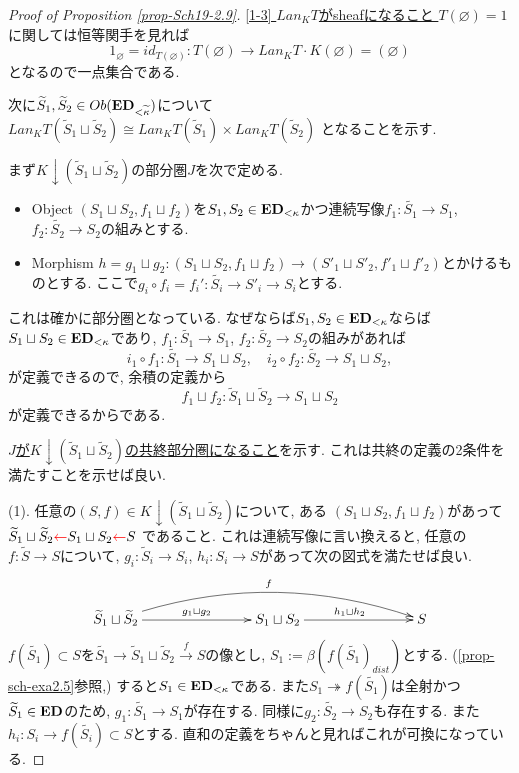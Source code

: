 \documentclass[dvipdfmx,a4paper,11pt]{article}
\theoremstyle{definition}
\newcommand{\xr}[1]{\textcolor{red}{#1}}
\begin{document}
\begin{proof}[Proof of Proposition \ref{prop-Sch19-2.9}]
\underline{[1-3] $Lan_{K}T$がsheafになること }
$T(\varnothing)=1$に関しては恒等関手を見れば
$$
1_{\varnothing}=id_{T(\varnothing)} : T(\varnothing) \to   Lan_{K}T\cdot K(\varnothing)=(\varnothing)
$$
となるので一点集合である.

次に$\widetilde{S}_1,  \widetilde{S}_2\in Ob({\bf ED}_{<\widetilde{\kappa}})$について
$Lan_{K}T (\widetilde{S}_1 \sqcup  \widetilde{S}_2) \cong
 Lan_{K}T (\widetilde{S}_1 ) \times  Lan_{K}T ( \widetilde{S}_2)$
となることを示す.

まず$K \downarrow  (\widetilde{S}_1 \sqcup  \widetilde{S}_2)$の部分圏$J$を次で定める.
\begin{itemize}
\item Object $(S_1 \sqcup  S_2, f_1 \sqcup  f_2)$を$S_1, S_2 \in {\bf ED}_{<\kappa}$かつ連続写像$f_1 : \widetilde{S_1} \to S_1$, $f_2 : \widetilde{S_2} \to S_2$の組みとする. 
\item Morphism $h=g_1\sqcup g_2 : (S_1 \sqcup S_2, f_1 \sqcup f_2) \to  (S'_{1} \sqcup S'_2, f'_1 \sqcup f'_2)$とかけるものとする. ここで$g_i \circ f_i = f_{i}' : \widetilde{S_i} \to S'_i \to S_{i}$とする. 
\end{itemize}
これは確かに部分圏となっている. 
なぜならば$S_1, S_2 \in {\bf ED}_{<\kappa}$ならば$S_1 \sqcup  S_2 \in {\bf ED}_{<\kappa}$であり, $f_1 : \widetilde{S_1} \to S_1$, $f_2 : \widetilde{S_2} \to S_2$の組みがあれば
$$
i_1 \circ f_1 : \widetilde{S_1} \to S_1 \sqcup S_2, \quad 
i_2 \circ f_2 : \widetilde{S_2} \to S_1 \sqcup S_2,
$$
が定義できるので, 余積の定義から
$$
f_1 \sqcup f_2  : \widetilde{S}_1 \sqcup \widetilde{S}_2  \to S_1 \sqcup S_2
$$
が定義できるからである. 

\underline{$J$が$K \downarrow  (\widetilde{S}_1 \sqcup  \widetilde{S}_2)$の共終部分圏になること}を示す. 
これは共終の定義の2条件を満たすことを示せば良い.

(1). 任意の$(S, f) \in K \downarrow  (\widetilde{S}_1 \sqcup  \widetilde{S}_2)$について, ある
$(S_1 \sqcup  S_2, f_1 \sqcup  f_2)$があって
$\widetilde{S}_1 \sqcup  \widetilde{S}_2 \xr{\leftarrow} S_1 \sqcup  S_2  \xr{\leftarrow} S$
であること.
これは連続写像に言い換えると, 任意の$f : \widetilde{S} \to S$について, 
$g_i: \widetilde{S}_i \to S_i$, $h_i: S_i \to S$があって次の図式を満たせば良い.
\begin{equation*}
\label{eq-conti}
\xymatrix@C=78pt@R=20pt{
\widetilde{S}_1 \sqcup  \widetilde{S}_2 \ar@/^20pt/[rr]^{f} 
 \ar@{->}[r]^{g_1 \sqcup  g_2}
&S_1 \sqcup  S_2  \ar@{->}[r]^{h_1 \sqcup  h_2}
& S
\\
}
\end{equation*}
$f(\widetilde{S_1} ) \subset S$を$\widetilde{S_1} \to \widetilde{S}_1 \sqcup  \widetilde{S}_2 \overset{f}{\to} S$の像とし, $S_1 := \beta (f(\widetilde{S_1} )_{dist}) $とする. (\ref{prop-sch-exa2.5}参照,)
すると$S_1 \in {\bf ED}_{<\kappa}$である.
また$S_1 \twoheadrightarrow f(\widetilde{S_1} ) $は全射かつ$\widetilde{S}_1 \in {\bf ED}$のため, $g_1 : \widetilde{S_1} \to S_1$が存在する. 
同様に$g_2 : \widetilde{S_2} \to S_2$も存在する.
また$h_i : S_i \to f(\widetilde{S_i} ) \subset S$とする.
直和の定義をちゃんと見ればこれが可換になっている.


\end{proof}
\end{document}
